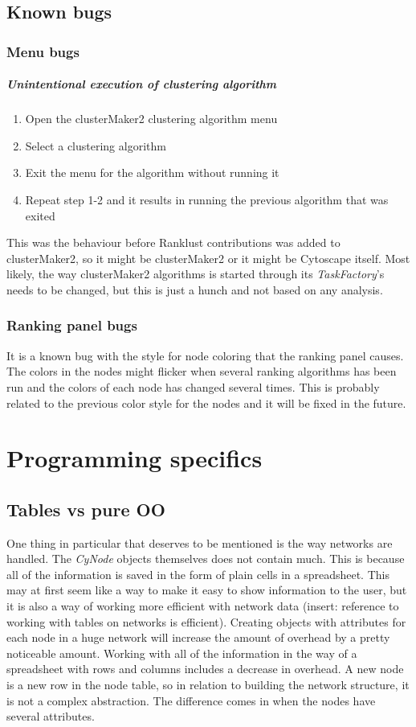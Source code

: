 \section{Known bugs}
\subsection{Menu bugs}
\paragraph{Unintentional execution of clustering algorithm}
\begin{enumerate}
    \item Open the clusterMaker2 clustering algorithm menu
    \item Select a clustering algorithm
    \item Exit the menu for the algorithm without running it
    \item Repeat step 1-2 and it results in running the previous algorithm that
        was exited
\end{enumerate}
This was the behaviour before Ranklust contributions was added to clusterMaker2,
so it might be clusterMaker2 or it might be Cytoscape itself. Most likely, the
way clusterMaker2 algorithms is started through its \textit{TaskFactory}'s needs
to be changed, but this is just a hunch and not based on any analysis.

\subsection{Ranking panel bugs}
It is a known bug with the style for node coloring that the ranking panel
causes. The colors in the nodes might flicker when several ranking algorithms
has been run and the colors of each node has changed several times. This is
probably related to the previous color style for the nodes and it will be fixed
in the future.

\chapter{Programming specifics}
\section{Tables vs pure OO}
One thing in particular that deserves to be mentioned is the way networks are
handled. The \textit{CyNode} objects themselves does not contain much. This is
because all of the information is saved in the form of plain cells in a
spreadsheet. This may at first seem like a way to make it easy to show
information to the user, but it is also a way of working more efficient with
network data (insert: reference to working with tables on networks is
efficient). Creating objects with attributes for each node in a huge network
will increase the amount of overhead by a pretty noticeable amount. Working with
all of the information in the way of a spreadsheet with rows and columns
includes a decrease in overhead. A new node is a new row in the node table, so
in relation to building the network structure, it is not a complex abstraction.
The difference comes in when the nodes have several attributes. 

